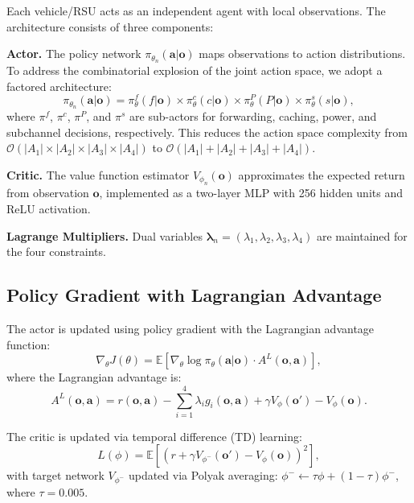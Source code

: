 \documentclass[journal]{IEEEtran}
\begin{document}
Each vehicle/RSU acts as an independent agent with local observations. The architecture consists of three components:

\textbf{Actor.} The policy network $\pi_{\theta_n}(\mathbf{a}|\mathbf{o})$ maps observations to action distributions. To address the combinatorial explosion of the joint action space, we adopt a factored architecture:
\begin{equation} \label{eq:factored_policy}
\pi_{\theta_n}(\mathbf{a}|\mathbf{o}) = \pi_{\theta}^f(f|\mathbf{o}) \times \pi_{\theta}^c(c|\mathbf{o}) \times \pi_{\theta}^P(P|\mathbf{o}) \times \pi_{\theta}^s(s|\mathbf{o}),
\end{equation}
where $\pi^f$, $\pi^c$, $\pi^P$, and $\pi^s$ are sub-actors for forwarding, caching, power, and subchannel decisions, respectively. This reduces the action space complexity from $\mathcal{O}(|A_1| \times |A_2| \times |A_3| \times |A_4|)$ to $\mathcal{O}(|A_1| + |A_2| + |A_3| + |A_4|)$.

\textbf{Critic.} The value function estimator $V_{\phi_n}(\mathbf{o})$ approximates the expected return from observation $\mathbf{o}$, implemented as a two-layer MLP with 256 hidden units and ReLU activation.

\textbf{Lagrange Multipliers.} Dual variables $\boldsymbol{\lambda}_n = (\lambda_1, \lambda_2, \lambda_3, \lambda_4)$ are maintained for the four constraints.

\subsection{Policy Gradient with Lagrangian Advantage} \label{subsec:2}

The actor is updated using policy gradient with the Lagrangian advantage function:
\begin{equation} \label{eq:actor_update}
\nabla_\theta J(\theta) = \mathbb{E}\left[\nabla_\theta \log \pi_\theta(\mathbf{a}|\mathbf{o}) \cdot A^L(\mathbf{o}, \mathbf{a})\right],
\end{equation}
where the Lagrangian advantage is:
\begin{equation} \label{eq:lagrangian_advantage}
A^L(\mathbf{o}, \mathbf{a}) = r(\mathbf{o}, \mathbf{a}) - \sum_{i=1}^{4} \lambda_i g_i(\mathbf{o}, \mathbf{a}) + \gamma V_\phi(\mathbf{o}') - V_\phi(\mathbf{o}).
\end{equation}

The critic is updated via temporal difference (TD) learning:
\begin{equation} \label{eq:critic_loss}
L(\phi) = \mathbb{E}\left[\left(r + \gamma V_{\phi^-}(\mathbf{o}') - V_\phi(\mathbf{o})\right)^2\right],
\end{equation}
with target network $V_{\phi^-}$ updated via Polyak averaging: $\phi^- \leftarrow \tau \phi + (1 - \tau)\phi^-$, where $\tau = 0.005$.
\end{document}
